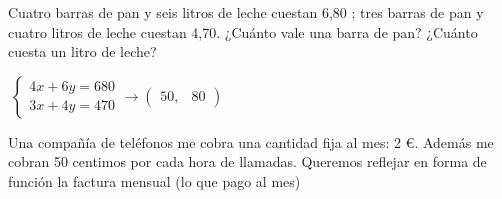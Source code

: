 \documentclass[addpoints,spanish, 12pt,a4paper]{exam}
\begin{document}
\begin{questions}
\question[1] Cuatro barras de pan y seis litros de leche cuestan 6,80 ; tres barras de pan y cuatro
litros de leche cuestan 4,70. ¿Cuánto vale una barra de pan? ¿Cuánto cuesta un
litro de leche?
\begin{solution} $\mathrm{~} \begin{cases} 4 x + 6 y = 680\\3 x + 4 y = 470\end{cases} \to \begin{pmatrix}50, & 80\end{pmatrix}$\end{solution}

\question Una compañía de teléfonos me cobra una cantidad fija al mes: 2 \euro . Además me cobran 50 centimos por cada hora de llamadas. Queremos reflejar en forma de función la factura mensual (lo que pago al mes)
\end{questions}
\end{document}
